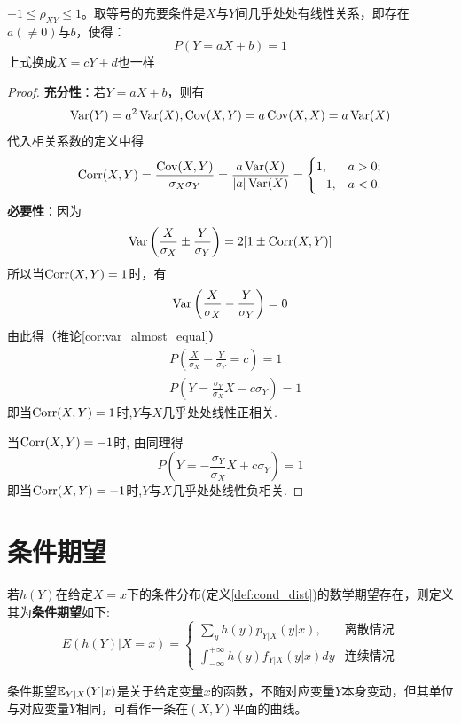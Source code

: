 \begin{proposition}
   $-1 \le \rho_{XY} \le 1$。取等号的充要条件是$X$与$Y$间几乎处处有线性关系，即存在$a(\ne0)$与$b$，使得：
    \[ P(Y=aX+b)=1 \]
    上式换成$X=cY+d$也一样
\end{proposition}
\begin{proof}
    \textbf{充分性}：若$Y=aX+b$，则有
    \[ \operatorname{Var}(Y)=a^2\operatorname{Var}(X),\operatorname{Cov}(X,Y)=a\operatorname{Cov}(X,X)=a\operatorname{Var}(X) \]
    代入相关系数的定义中得
    \[ \operatorname{Corr}(X,Y)=\frac{\operatorname{Cov}(X,Y)}{\sigma_{X}\sigma_{Y}}=\frac{a\operatorname{Var}(X)}{|a|\operatorname{Var}(X)}=\begin{cases}
            1,  & a>0; \\
            -1, & a<0.
        \end{cases} \]
    \textbf{必要性}：因为
    \[ \operatorname{Var}\left(\frac{X}{\sigma_{X}}\pm\frac{Y}{\sigma_{Y}} \right)=2[1\pm\operatorname{Corr}(X,Y)] \]
    所以当$\operatorname{Corr}(X,Y)=1$时，有
    \[ \operatorname{Var}\left(\frac{X}{\sigma_{X}}-\frac{Y}{\sigma_{Y}} \right)=0 \]
    由此得（推论\ref{cor:var_almost_equal}）
    \begin{align*}
         & P\left(\frac{X}{\sigma_{X}}-\frac{Y}{\sigma_{Y}}=c \right)=1  \\
         & P\left(Y=\frac{\sigma_{Y}}{\sigma_{X}}X-c\sigma_{Y} \right)=1
    \end{align*}
    即当$\operatorname{Corr}(X,Y)=1$时,$Y$与$X$几乎处处线性正相关.

    当$\operatorname{Corr}(X,Y)=-1$时, 由同理得
    \[ P\left(Y=-\frac{\sigma_{Y}}{\sigma_{X}}X+c\sigma_{Y} \right)=1 \]
    即当$\operatorname{Corr}(X,Y)=-1$时,$Y$与$X$几乎处处线性负相关.
\end{proof}

\section{条件期望}

\begin{definition}
    若$h(Y)$在给定$X=x$下的条件分布(定义\ref{def:cond_dist})的数学期望存在，则定义其为\textbf{条件期望}如下:
    \[ E(h(Y)|X=x) =\begin{cases}
            \sum_y h(y) p_{Y|X}(y|x),                      & \text{离散情况} \\
            \int_{-\infty}^{+\infty} h(y) f_{Y|X}(y|x) d y & \text{连续情况}
        \end{cases}\]
\end{definition}
\begin{remark}
    条件期望$\mathbb{E}_{Y|X}(Y|x)$是关于给定变量$x$的函数，不随对应变量$Y$本身变动，但其单位与对应变量$Y$相同，可看作一条在$(X,Y)$平面的曲线。
\end{remark}

